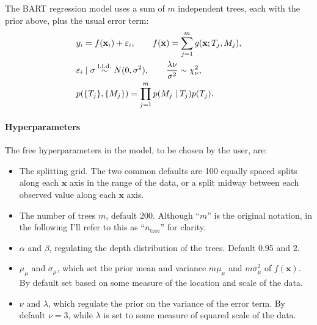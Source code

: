 \documentclass{article}
\begin{document}
    The BART regression model uses a sum of $m$ independent trees, each with the prior above, plus the usual error term:
    \begin{align}
        &
        y_i = f(\mathbf x_i) + \varepsilon_i
        , \qquad
        f(\mathbf x) = \sum_{j=1}^m g(\mathbf x; T_j, M_j)
        , \label{eq:bartdef} \\
        &
        \varepsilon_i \mid\sigma \overset{\mathrm{i.i.d.}}\sim \mathcal \mathcal N(0, \sigma^2)
        , \qquad
        \frac{\lambda\nu}{\sigma^2} \sim \chi^2_\nu
        , \\
        &
        p(\{T_j\}, \{M_j\}) = \prod_{j=1}^m p(M_j \mid T_j) p(T_j).
        \label{eq:bartdef2}
    \end{align}

    \paragraph{Hyperparameters}
    
    The free hyperparameters in the model, to be chosen by the user, are:
    \begin{itemize}

        \item The splitting grid. The two common defaults are 100 equally spaced splits along each $\mathbf x$ axis in the range of the data, or a split midway between each observed value along each $\mathbf x$ axis.
        
        \item The number of trees $m$, default 200. Although ``$m$'' is the original notation, in the following I'll refer to this as ``$n_\text{tree}$'' for clarity.
        
        \item $\alpha$ and $\beta$, regulating the depth distribution of the
        trees. Default 0.95 and 2.
        
        \item $\mu_\mu$ and $\sigma_\mu$, which set the prior mean and variance
        $m\mu_\mu$ and $m\sigma_\mu^2$ of $f(\mathbf x)$. By default set based on some measure of the location and scale of the data.
        
        \item $\nu$ and $\lambda$, which regulate the prior on the variance of the error term. By default $\nu=3$, while $\lambda$ is set to some measure of squared scale of the data.

    \end{itemize}
\end{document}
